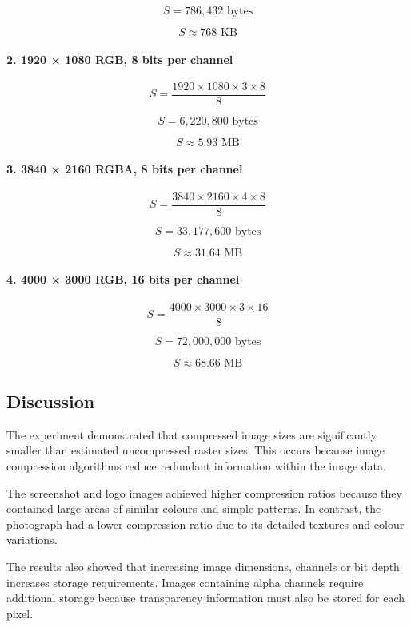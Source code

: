 \documentclass[12pt,a4paper]{article}
\begin{document}
\[
S = 786,432 \text{ bytes}
\]

\[
S \approx 768 \text{ KB}
\]

\paragraph{2. 1920 × 1080 RGB, 8 bits per channel}

\[
S = \frac{1920 \times 1080 \times 3 \times 8}{8}
\]

\[
S = 6,220,800 \text{ bytes}
\]

\[
S \approx 5.93 \text{ MB}
\]

\paragraph{3. 3840 × 2160 RGBA, 8 bits per channel}

\[
S = \frac{3840 \times 2160 \times 4 \times 8}{8}
\]

\[
S = 33,177,600 \text{ bytes}
\]

\[
S \approx 31.64 \text{ MB}
\]

\paragraph{4. 4000 × 3000 RGB, 16 bits per channel}

\[
S = \frac{4000 \times 3000 \times 3 \times 16}{8}
\]

\[
S = 72,000,000 \text{ bytes}
\]

\[
S \approx 68.66 \text{ MB}
\]

\subsection{Discussion}

The experiment demonstrated that compressed image sizes are significantly smaller than estimated uncompressed raster sizes. This occurs because image compression algorithms reduce redundant information within the image data.

The screenshot and logo images achieved higher compression ratios because they contained large areas of similar colours and simple patterns. In contrast, the photograph had a lower compression ratio due to its detailed textures and colour variations.

The results also showed that increasing image dimensions, channels or bit depth increases storage requirements. Images containing alpha channels require additional storage because transparency information must also be stored for each pixel.
\end{document}
